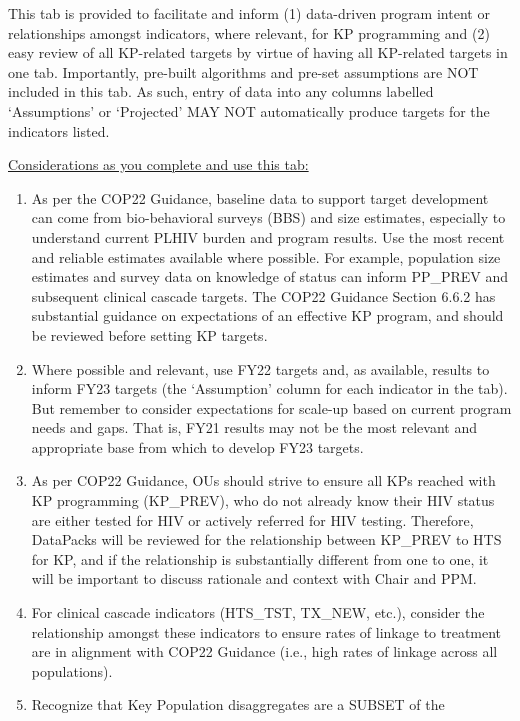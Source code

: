 \documentclass[
  openany]{book}
\begin{document}
This tab is provided to facilitate and inform (1) data-driven program
intent or relationships amongst indicators, where relevant, for KP
programming and (2) easy review of all KP-related targets by virtue of
having all KP-related targets in one tab. Importantly, pre-built
algorithms and pre-set assumptions are NOT included in this tab. As
such, entry of data into any columns labelled `Assumptions' or
`Projected' MAY NOT automatically produce targets for the indicators
listed.

\underline{Considerations as you complete and use this tab:}

\begin{enumerate}
\def\labelenumi{\arabic{enumi}.}
\item
  As per the COP22 Guidance, baseline data to support target
  development can come from bio-behavioral surveys (BBS) and size
  estimates, especially to understand current PLHIV burden and program
  results. Use the most recent and reliable estimates available where
  possible. For example, population size estimates and survey data on
  knowledge of status can inform PP\_PREV and subsequent clinical
  cascade targets. The COP22 Guidance Section 6.6.2 has substantial
  guidance on expectations of an effective KP program, and should be
  reviewed before setting KP targets.
\item
  Where possible and relevant, use FY22 targets and, as available,
  results to inform FY23 targets (the `Assumption' column for each
  indicator in the tab). But remember to consider expectations for
  scale-up based on current program needs and gaps. That is, FY21
  results may not be the most relevant and appropriate base from which
  to develop FY23 targets.
\item
  As per COP22 Guidance, OUs should strive to ensure all KPs reached
  with KP programming (KP\_PREV), who do not already know their HIV
  status are either tested for HIV or actively referred for HIV
  testing. Therefore, DataPacks will be reviewed for the relationship
  between KP\_PREV to HTS for KP, and if the relationship is
  substantially different from one to one, it will be important to
  discuss rationale and context with Chair and PPM.
\item
  For clinical cascade indicators (HTS\_TST, TX\_NEW, etc.), consider
  the relationship amongst these indicators to ensure rates of linkage
  to treatment are in alignment with COP22 Guidance (i.e., high rates
  of linkage across all populations).
\item
  Recognize that Key Population disaggregates are a SUBSET of the

\end{enumerate}
\end{document}
